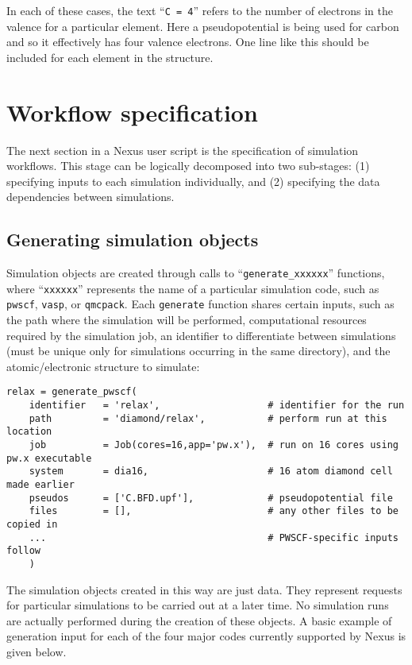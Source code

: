 \documentclass[oneside,11pt]{memoir}
\numberwithin{equation}{section}
\begin{document}
\noindent
In each of these cases, the text ``\texttt{C = 4}'' refers to the number of electrons in the valence for a particular element.  Here a pseudopotential is being used for carbon and so it effectively has four valence electrons.  One line like this should be included for each element in the structure.



\section{Workflow specification}\label{sec:user_workflows}
The next section in a Nexus user script is the specification of simulation workflows.  This stage can be logically decomposed into two sub-stages: (1) specifying inputs to each simulation individually, and (2) specifying the data dependencies between simulations.

\subsection{Generating simulation objects}
Simulation objects are created through calls to ``\texttt{generate\_xxxxxx}'' functions, where ``\texttt{xxxxxx}'' represents the name of a particular simulation code, such as \texttt{pwscf}, \texttt{vasp}, or \texttt{qmcpack}.  Each \texttt{generate} function shares certain inputs, such as the path where the simulation will be performed, computational resources required by the simulation job, an identifier to differentiate between simulations (must be unique only for simulations occurring in the same directory), and the atomic/electronic structure to simulate:
\begin{verbatim}
relax = generate_pwscf(      
    identifier   = 'relax',                   # identifier for the run 
    path         = 'diamond/relax',           # perform run at this location
    job          = Job(cores=16,app='pw.x'),  # run on 16 cores using pw.x executable
    system       = dia16,                     # 16 atom diamond cell made earlier
    pseudos      = ['C.BFD.upf'],             # pseudopotential file
    files        = [],                        # any other files to be copied in
    ...                                       # PWSCF-specific inputs follow
    )
\end{verbatim}
The simulation objects created in this way are just data.  They represent requests for particular simulations to be carried out at a later time.  No simulation runs are actually performed during the creation of these objects. A basic example of generation input for each of the four major codes currently supported by Nexus is given below. 
\end{document}
